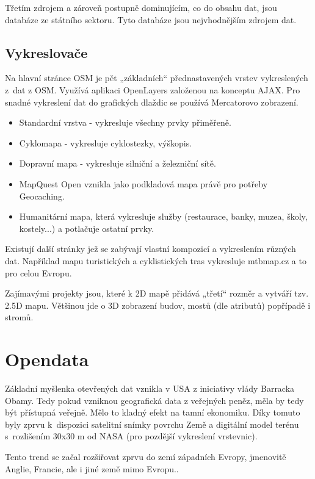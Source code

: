 Třetím zdrojem a zároveň postupně dominujícím, co do obsahu dat, jsou 
databáze ze státního sektoru. Tyto databáze jsou nejvhodnějším zdrojem 
dat.

\subsection{Vykreslovače}
\label{Vykreslovače}
Na hlavní stránce OSM je pět „základních“ přednastavených vrstev vykreslených 
z~dat z OSM. Využívá aplikaci OpenLayers založenou na konceptu AJAX.
Pro snadné vykreslení dat do grafických dlaždic se používá Mercatorovo zobrazení.

\begin{itemize}

  \item Standardní vrstva - vykresluje všechny prvky přiměřeně.
  \item Cyklomapa - vykresluje cyklostezky, výškopis. 
  \item Dopravní mapa - vykresluje silniční a železniční sítě.
  \item MapQuest Open vznikla jako podkladová mapa právě pro potřeby 
Geocaching.
  \item Humanitární mapa, která vykresluje služby (restaurace, banky, muzea, 
  školy, kostely...)  a potlačuje ostatní prvky. 

\end{itemize}

Existují další stránky jež se zabývají vlastní kompozicí a vykreslením
různých dat. Například mapu turistických a cyklistických tras vykresluje
 mtbmap.cz a to pro celou Evropu. 
 
Zajímavými projekty jsou, které k 2D mapě přidává „třetí“ rozměr a 
vytváří tzv. 2.5D mapu. Většinou jde o 3D zobrazení budov, mostů (dle 
atributů) popřípadě i stromů. 

\section{Opendata}
\label{opendata}
Základní myšlenka otevřených dat vznikla v USA z iniciativy vlády Barracka Obamy.
Tedy pokud vzniknou geografická data z veřejných peněz, měla by tedy být
přístupná veřejně. Mělo to kladný efekt na tamní ekonomiku. Díky tomuto byly
zprvu k~dispozici satelitní snímky povrchu Země a digitální model terénu
s~rozlišením 30x30 m od NASA (pro pozdější vykreslení vrstevnic).

Tento trend se začal rozšiřovat zprvu do zemí západních Evropy,
jmenovitě Anglie, Francie, ale i jiné země mimo Evropu..

